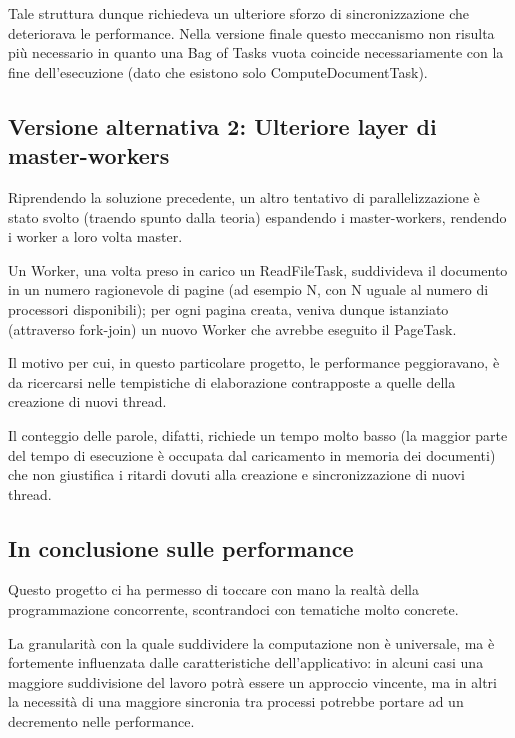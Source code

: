 \noindent Tale struttura dunque richiedeva un ulteriore sforzo di sincronizzazione che deteriorava le performance. Nella versione finale questo meccanismo non risulta più necessario in quanto una Bag of Tasks vuota coincide necessariamente con la fine dell'esecuzione (dato che esistono solo ComputeDocumentTask).

\subsection{Versione alternativa 2: Ulteriore layer di master-workers}
Riprendendo la soluzione precedente, un altro tentativo di parallelizzazione è stato svolto (traendo spunto dalla teoria) espandendo i master-workers, rendendo i worker a loro volta master.\newline

\noindent Un Worker, una volta preso in carico un ReadFileTask, suddivideva il documento in un numero ragionevole di pagine (ad esempio N, con N uguale al numero di processori disponibili); per ogni pagina creata, veniva dunque istanziato (attraverso fork-join) un nuovo Worker che avrebbe eseguito il PageTask.\newline

\noindent Il motivo per cui, in questo particolare progetto, le performance peggioravano, è da ricercarsi nelle tempistiche di elaborazione contrapposte a quelle della creazione di nuovi thread.\newline

\noindent Il conteggio delle parole, difatti, richiede un tempo molto basso (la maggior parte del tempo di esecuzione è occupata dal caricamento in memoria dei documenti) che non giustifica i ritardi dovuti alla creazione e sincronizzazione di nuovi thread.

\subsection{In conclusione sulle performance}
Questo progetto ci ha permesso di toccare con mano la realtà della programmazione concorrente, scontrandoci con tematiche molto concrete.\newline

\noindent La granularità con la quale suddividere la computazione non è universale, ma è fortemente influenzata dalle caratteristiche dell'applicativo: in alcuni casi una maggiore suddivisione del lavoro potrà essere un approccio vincente, ma in altri la necessità di una maggiore sincronia tra processi potrebbe portare ad un decremento nelle performance.
